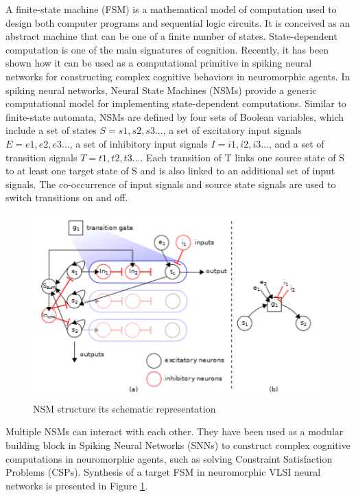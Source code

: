 \documentclass[main]{subfiles}
\begin{document}
A finite-state machine (FSM) is a mathematical model of computation used to design both computer programs and sequential logic circuits. It is conceived as an abstract machine that can be one of a finite number of states. State-dependent computation is one of the main signatures of cognition. Recently, it has been shown how it can be used as a computational primitive in spiking neural networks for constructing complex cognitive behaviors in neuromorphic agents. In spiking neural networks, Neural  State Machines (NSMs) provide a generic computational model for implementing state-dependent computations. Similar to finite-state automata, NSMs are defined by four sets of Boolean variables, which include a set of states $S={s1,s2,s3...}$, a set of excitatory input signals $E={e1,e2,e3...}$, a set of inhibitory input signals $I={i1,i2,i3...}$, and a set of transition signals $T={t1,t2,t3...}$. Each  transition  of T links one source state of S to at least one target state of S and is also linked to an additional set of input signals. The co-occurrence of input signals and source state signals are used to switch transitions on and off. 

%
\begin{figure}[h]
    \centering
    \includegraphics[width=0.8\linewidth]{12_NeuromorphicSystems2/figures/nsm0.PNG}
    \caption{NSM structure its schematic representation}
    \label{fig:nsm}
\end{figure}
%

Multiple NSMs can interact with each other. They have been used as a modular building block in Spiking Neural Networks (SNNs) to construct complex cognitive computations in neuromorphic agents, such as solving Constraint Satisfaction Problems (CSPs). Synthesis of a target FSM in neuromorphic VLSI neural networks is presented in Figure \ref{fig:nsm}.
\end{document}
